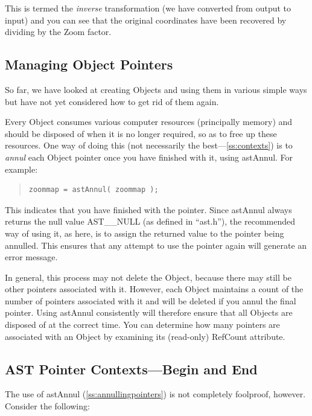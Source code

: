 \documentclass[twoside,11pt]{article}
\newcommand{\htmlref}[2]{#1}
\newcommand{\secref}[1]{\S\ref{#1}}
\renewcommand{\secref}[1]{\ref{#1}}
\begin{document}
This is termed the {\em{inverse}} transformation (we have converted
from output to input) and you can see that the original coordinates
have been recovered by dividing by the Zoom factor.

\subsection{\label{ss:annullingpointers}Managing Object Pointers}

So far, we have looked at creating Objects and using them in various
simple ways but have not yet considered how to get rid of them again.

Every \htmlref{Object}{Object} consumes various computer resources (principally memory)
and should be disposed of when it is no longer required, so as to free
up these resources. One way of doing this (not necessarily the
best---\secref{ss:contexts}) is to {\em{annul}} each Object pointer once
you have finished with it, using \htmlref{astAnnul}{astAnnul}. For example:

\begin{quote}
\small
\begin{verbatim}
zoommap = astAnnul( zoommap );
\end{verbatim}
\normalsize
\end{quote}

This indicates that you have finished with the pointer. Since astAnnul
always returns the null value AST\_\_NULL (as defined in ``ast.h''),
the recommended way of using it, as here, is to assign the returned
value to the pointer being annulled. This ensures that any attempt to
use the pointer again will generate an error message.

In general, this process may not delete the Object, because there may
still be other pointers associated with it. However, each Object
maintains a count of the number of pointers associated with it and
will be deleted if you annul the final pointer. Using astAnnul
consistently will therefore ensure that all Objects are disposed of at
the correct time. You can determine how many pointers are associated
with an Object by examining its (read-only) \htmlref{RefCount}{RefCount} attribute.

\subsection{\label{ss:contexts}AST Pointer Contexts---Begin and End}

The use of \htmlref{astAnnul}{astAnnul} (\secref{ss:annullingpointers}) is not completely
foolproof, however. Consider the following:
\end{document}
